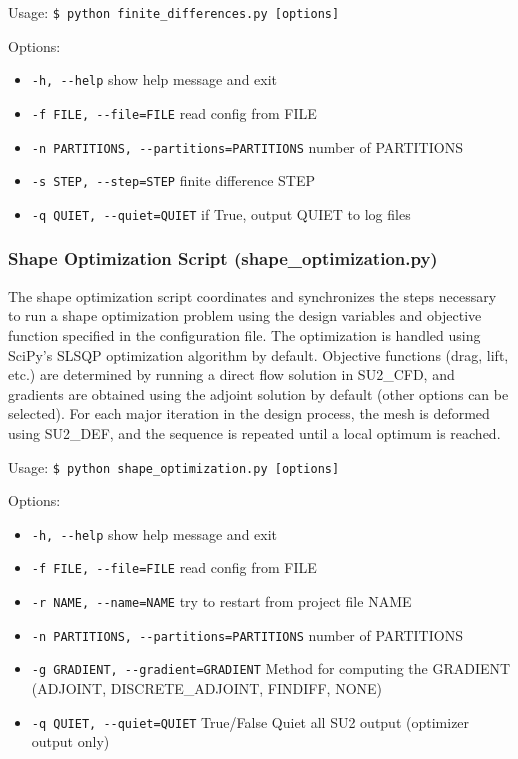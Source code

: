 \documentclass{article}
\begin{document}
Usage: \verb|$ python finite_differences.py [options]|

Options:

\begin{itemize}
    \item \verb|-h, --help| show help message and exit
    \item \verb|-f FILE, --file=FILE| read config from FILE
    \item \verb|-n PARTITIONS, --partitions=PARTITIONS| number of PARTITIONS
    \item \verb|-s STEP, --step=STEP| finite difference STEP
    \item \verb|-q QUIET, --quiet=QUIET| if True, output QUIET to log files
\end{itemize}
    
    
   
    
    

\subsubsection{Shape Optimization Script (shape\_optimization.py)}

The shape optimization script coordinates and synchronizes the steps necessary to run a shape optimization problem using the design variables and objective function specified in the configuration file. The optimization is handled using SciPy’s SLSQP optimization algorithm by default. Objective functions (drag, lift, etc.) are determined by running a direct flow solution in SU2\_CFD, and gradients are obtained using the adjoint solution by default (other options can be selected). For each major iteration in the design process, the mesh is deformed using SU2\_DEF, and the sequence is repeated until a local optimum is reached.

Usage: \verb|$ python shape_optimization.py [options]|

Options:
\begin{itemize}
    \item \verb|-h, --help| show help message and exit
    \item \verb|-f FILE, --file=FILE| read config from FILE
    \item \verb|-r NAME, --name=NAME| try to restart from project file NAME
    \item \verb|-n PARTITIONS, --partitions=PARTITIONS| number of PARTITIONS
    \item \verb|-g GRADIENT, --gradient=GRADIENT| Method for computing the GRADIENT (ADJOINT, DISCRETE\_ADJOINT, FINDIFF, NONE)
    \item \verb|-q QUIET, --quiet=QUIET| True/False Quiet all SU2 output (optimizer output only)
\end{itemize}
    
\end{document}
